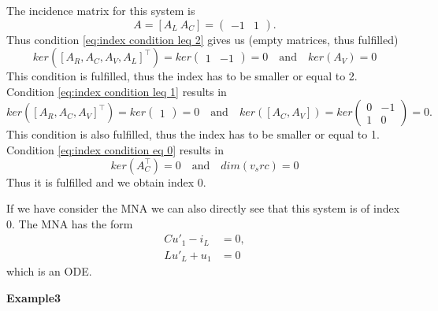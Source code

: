 	The incidence matrix for this system is
	\begin{displaymath}
		A = [A_L~A_C] = 
		\left(
		\begin{matrix}
			-1 & 1
		\end{matrix}
		\right).
	\end{displaymath} 
	Thus condition \eqref{eq:index condition leq 2} gives us (empty matrices, thus fulfilled)
	\begin{displaymath}
		ker([A_R, A_C, A_V, A_L]^\top) = ker
		\left(
		\begin{matrix}
			1 & -1
		\end{matrix}
		\right) = 0 
		\quad \text{and} \quad 
		ker(A_V) = 0
	\end{displaymath}
	This condition is fulfilled, thus the index has to be smaller or equal to 2.
	Condition \eqref{eq:index condition leq 1} results in
	\begin{displaymath}
		ker([A_R, A_C, A_V]^\top) = ker\left(
		\begin{matrix}
			1
		\end{matrix}
		\right) = 0
		\quad \text{and} \quad
		ker([A_C, A_V]) = ker
		\left(
		\begin{matrix}
			0 & -1\\
			1 & 0
		\end{matrix}
		\right) = 0.
	\end{displaymath}
	This condition is also fulfilled, thus the index has to be smaller or equal to 1.
	Condition \eqref{eq:index condition eq 0} results in
	\begin{displaymath}
		ker(A_C^\top) = 0 \quad \text{and} \quad dim(v_src) = 0
	\end{displaymath}
	Thus it is fulfilled and we obtain index 0.
	
	If we have consider the MNA we can also directly see that this system is of index 0. The MNA has the form
	\begin{displaymath}
		\begin{aligned}
			C u'_1 - i_L &= 0, \\
			L u'_L + u_1 &= 0
		\end{aligned}
	\end{displaymath}
	which is an ODE.
	
	\textbf{Example3} \\
